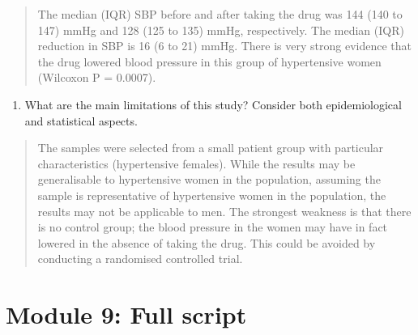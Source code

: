 \documentclass[
]{memoir}
\providecommand{\tightlist}{%
  \setlength{\itemsep}{0pt}\setlength{\parskip}{0pt}}
\begin{document}
\begin{quote}
The median (IQR) SBP before and after taking the drug was 144 (140 to 147) mmHg and 128 (125 to 135) mmHg, respectively. The median (IQR) reduction in SBP is 16 (6 to 21) mmHg. There is very strong evidence that the drug lowered blood pressure in this group of hypertensive women (Wilcoxon P = 0.0007).
\end{quote}

\begin{enumerate}
\def\labelenumi{\alph{enumi})}
\setcounter{enumi}{3}
\tightlist
\item
  What are the main limitations of this study? Consider both epidemiological and statistical aspects.
\end{enumerate}

\begin{quote}
The samples were selected from a small patient group with particular characteristics (hypertensive females). While the results may be generalisable to hypertensive women in the population, assuming the sample is representative of hypertensive women in the population, the results may not be applicable to men. The strongest weakness is that there is no control group; the blood pressure in the women may have in fact lowered in the absence of taking the drug. This could be avoided by conducting a randomised controlled trial.
\end{quote}

\hypertarget{module-9-full-script}{%
\chapter*{Module 9: Full script}\label{module-9-full-script}}
\end{document}
